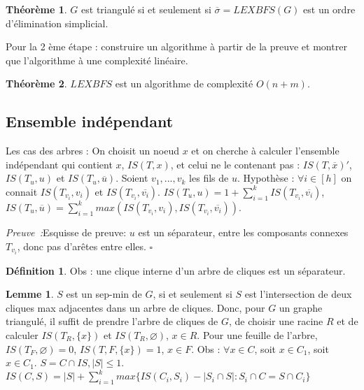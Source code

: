 \documentclass{book}
\theoremstyle{definition}
\newtheorem{lemma}{Lemme}
\newtheorem{theorem}{Théorème}
\newtheorem{definition}{Définition}
\numberwithin{lemma}{subsection}
\numberwithin{theorem}{subsection}
\numberwithin{definition}{subsection}
\numberwithin{proposition}{subsection}
\numberwithin{corollary}{subsection}
\numberwithin{property}{subsection}
\numberwithin{example}{subsection}
\numberwithin{heuristique}{subsection}
\numberwithin{scenario}{subsection}
\newenvironment{proofi} {\noindent\emph{Preuve~:}} {\hfill $\square$\vspace{0.2cm}}
\begin{document}

\begin{theorem}
 $G$ est triangulé si et seulement si $\overline{\sigma} = LEXBFS(G)$ est un ordre d'élimination simplicial.
\end{theorem}

Pour la 2 ème étape : construire un algorithme à partir de la preuve et montrer que l'algorithme à une complexité linéaire.

\begin{theorem}
 $LEXBFS$ est un algorithme de complexité $O(n+m)$.
\end{theorem}

\subsection{Ensemble indépendant}

Les cas des arbres : 
On choisit un noeud $x$ et on cherche à calculer l'ensemble indépendant qui contient $x$, $IS(T, x)$, et celui ne le contenant pas : $IS(T, \overline{x})'$, $IS(T_u, u)$ et $IS(T_u, \overline{u})$. Soient $v_1, ..., v_k$ les fils de $u$. Hypothèse : $\forall i \in [h]$ on connait $IS(T_v_i, v_i)$ et $IS(T_v_i, \overline{v_i})$. $IS(T_u, u) = 1 + \sum_{i=1}^k IS(T_v_i, \overline{v_i})$, $IS(T_u, \overline{u}) = \sum_{i=1}^k max(IS(T_v_i, v_i), IS(T_v_i, \overline{v_i}))$.

\begin{proofi}{Esquisse de preuve:}
$u$ est un séparateur, entre les composants connexes $T_v_i$, donc pas d'arêtes entre elles.
\end{proofi}

\begin{definition}
Obs : une clique interne d'un arbre de cliques est un séparateur.
\end{definition}

\begin{lemma}
$S$ est un sep-min de $G$, si et seulement si $S$ est l'intersection de deux cliques max adjacentes dans un arbre de cliques. Donc, pour $G$ un graphe triangulé, il suffit de prendre l'arbre de cliques de $G$, de choisir une racine $R$ et de calculer $IS(T_R, \{x\})$ et $IS(T_R, \varnothing)$, $x \in R$. Pour une feuille de l'arbre, $IS(T_F, \varnothing) = 0$, $IS(T, F, \{ x \}) = 1$, $x \in F$.  
Obs : $\forall x \in C$, soit $x \in C_1$, soit $x \in C_1$.
$S = C \cap IS, |S| \leq 1$. $IS(C, S) = |S| + \sum_{i=1}^k max \{IS(C_i, S_i) - |S_i \cap S| : S_i \cap C = S \cap C_i \}$
\end{lemma}
\end{document}
